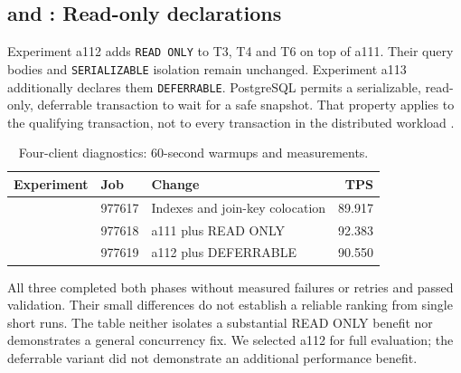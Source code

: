 \subsection{ and : Read-only declarations}
Experiment a112 adds \texttt{READ ONLY} to T3, T4 and T6 on top of a111.
Their query bodies and \texttt{SERIALIZABLE} isolation remain unchanged.
Experiment a113 additionally declares them \texttt{DEFERRABLE}. PostgreSQL permits
a serializable, read-only, deferrable transaction to wait for a safe snapshot.
That property applies to the qualifying transaction, not to every transaction
in the distributed workload \citep{pg-set-transaction}.

\begin{table}[htbp]
\caption{Four-client diagnostics: 60-second warmups and measurements.}
\label{tab:a-read-only}
\begin{tabularx}{\linewidth}{@{}llYr@{}}
\toprule
\textbf{Experiment} & \textbf{Job} & \textbf{Change} & \textbf{TPS} \\
\midrule
{} & 977617 & Indexes and join-key colocation & 89.917 \\
 & 977618 & a111 plus READ ONLY & 92.383 \\
 & 977619 & a112 plus DEFERRABLE & 90.550 \\
\bottomrule
\end{tabularx}
\end{table}

All three completed both phases without measured failures or retries and passed
validation. Their small differences do not establish a reliable ranking from
single short runs. The table neither isolates a substantial READ ONLY benefit
nor demonstrates a general concurrency fix. We selected a112 for full evaluation;
the deferrable variant did not demonstrate an additional performance benefit.
